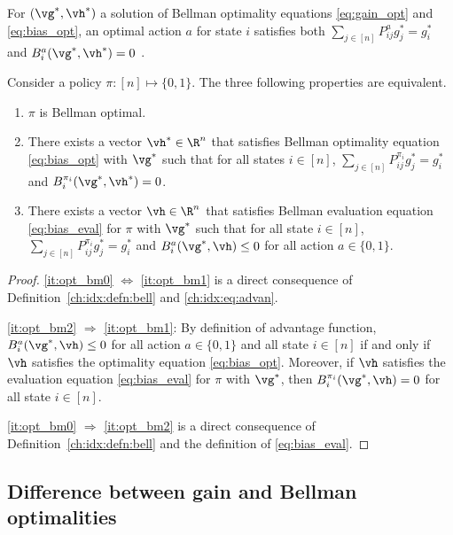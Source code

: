 For $(\vg^*,\vh^*)$ a solution of Bellman optimality equations \eqref{eq:gain_opt} and \eqref{eq:bias_opt},
an optimal action $a$ for state $i$ satisfies both $\sum_{j\in[n]}P^a_{ij}g^*_j =g^*_i$ and $B^a_i(\vg^*,\vh^*)=0$ \cite{puterman2014markov, schweitzer1978functional}.
\begin{lem}
    \label{ch:idx:lem:bell_charac}
    Consider a policy $\pi:[n]\mapsto\{0,1\}$.
    The three following properties are equivalent.
    \begin{enumerate}[label=(\roman*)]
        \item \label{it:opt_bm0} $\pi$ is Bellman optimal.
        \item \label{it:opt_bm1} There exists a vector $\vh^*\in\R^{n}$ that satisfies Bellman optimality equation \eqref{eq:bias_opt} with $\vg^*$ such that for all states $i\in[n]$, $\sum_{j\in[n]}P^{\pi_i}_{ij}g^*_j=g^*_i$ and $B^{\pi_i}_i(\vg^*,\vh^*)=0$.
        \item \label{it:opt_bm2} There exists a vector $\vh\in\R^{n}$ that satisfies Bellman evaluation equation \eqref{eq:bias_eval} for $\pi$ with $\vg^*$ such that for all state $i\in[n]$, $\sum_{j\in[n]}P^{\pi_i}_{ij}g^*_j=g^*_i$ and $B^a_i(\vg^*,\vh)\le0$ for all action $a\in\{0,1\}$.
        \end{enumerate}
\end{lem}
\begin{proof}
    \ref{it:opt_bm0} $\Leftrightarrow$ \ref{it:opt_bm1} is a direct consequence of Definition~\ref{ch:idx:defn:bell} and \eqref{ch:idx:eq:advan}.

    \ref{it:opt_bm2} $\Rightarrow$ \ref{it:opt_bm1}: By definition of advantage function, $B^a_i(\vg^*,\vh)\le0$ for all action $a\in\{0,1\}$ and all state $i\in[n]$ if and only if $\vh$ satisfies the optimality equation \eqref{eq:bias_opt}.
    Moreover, if $\vh$ satisfies the evaluation equation \eqref{eq:bias_eval} for $\pi$ with $\vg^*$, then $B^{\pi_i}_i(\vg^*,\vh)=0$ for all state $i\in[n]$.

    \ref{it:opt_bm0} $\Rightarrow$ \ref{it:opt_bm2} is a direct consequence of Definition~\ref{ch:idx:defn:bell} and the definition of \eqref{eq:bias_eval}.
\end{proof}

\subsection{Difference between gain and Bellman optimalities}
\label{ch:idx:ssec:gain_bell}

